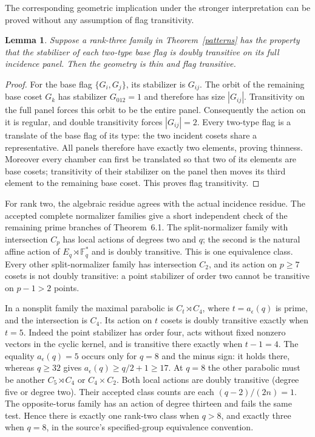 \documentclass[11pt,a4paper]{article}
\newtheorem{lemma}{Lemma}
\newcommand{\F}{\mathbb F}
\begin{document}
The corresponding geometric implication under the stronger interpretation
can be proved without any assumption of flag transitivity.
\begin{lemma}\label{actual}
Suppose a rank-three family in Theorem~\ref{patterns} has the property
that the stabilizer of each two-type base flag is doubly transitive on
its full incidence panel. Then the geometry is thin and flag transitive.
\end{lemma}
\begin{proof}
For the base flag $\{G_i,G_j\}$, its stabilizer is $G_{ij}$.
The orbit of the remaining base coset $G_k$ has stabilizer
$G_{012}=1$ and therefore has size $|G_{ij}|$. Transitivity on the
full panel forces this orbit to be the entire panel. Consequently the
action on it is regular, and double transitivity forces $|G_{ij}|=2$.
Every two-type flag is a translate of the base flag of its type:
the two incident cosets share a representative. All panels therefore
have exactly two elements, proving thinness. Moreover every chamber
can first be translated so that two of its elements are base cosets;
transitivity of their stabilizer on the panel then moves its third
element to the remaining base coset. This proves flag transitivity.
\end{proof}

For rank two, the algebraic residue agrees with the actual incidence
residue. The accepted complete normalizer families give a short
independent check of the remaining prime branches of Theorem~6.1.
The split-normalizer family with intersection $C_p$ has local actions
of degrees two and $q$; the second is the natural affine action of
$E_q\rtimes\F_q^*$ and is doubly transitive. This is one equivalence
class. Every other split-normalizer family has intersection $C_2$,
and its action on $p\ge7$ cosets is not doubly transitive: a point
stabilizer of order two cannot be transitive on $p-1>2$ points.

In a nonsplit family the maximal parabolic is $C_t\rtimes C_4$,
where $t=a_\epsilon(q)$ is prime, and the intersection is $C_4$.
Its action on $t$ cosets is doubly transitive exactly when $t=5$.
Indeed the point stabilizer has order four, acts without fixed
nonzero vectors in the cyclic kernel, and is transitive there exactly
when $t-1=4$. The equality $a_\epsilon(q)=5$ occurs only for $q=8$
and the minus sign: it holds there, whereas $q\ge32$ gives
$a_\epsilon(q)\ge q/2+1\ge17$.
At $q=8$ the other parabolic must be another $C_5\rtimes C_4$ or
$C_4\times C_2$. Both local actions are doubly transitive (degree
five or degree two). Their accepted class counts are each
$(q-2)/(2n)=1$. The opposite-torus family has an action of degree
thirteen and fails the same test. Hence there is exactly one rank-two
class when $q>8$, and exactly three when $q=8$, in the source's
specified-group equivalence convention.
\end{document}
